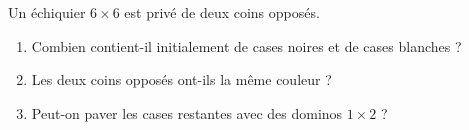 Un échiquier $6 \times 6$ est privé de deux coins opposés.
\begin{enumerate}
  \item Combien contient-il initialement de cases noires et de cases
  blanches ?
  \item Les deux coins opposés ont-ils la même couleur ?
  \item Peut-on paver les cases restantes avec des dominos $1 \times 2$ ?
\end{enumerate}
